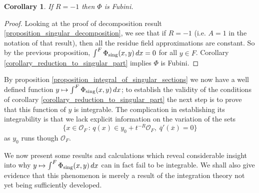 \documentclass{lmsMODIFIED}
\newtheorem{corollary}[theorem]{Corollary}
\newcommand{\roi}{\mathcal{O}}
\newcommand{\res}[1]{\overline{#1}}
\newcommand{\sub}[1]{{\mbox{\scriptsize {#1}}}}
\begin{document}
\begin{corollary}\label{corollary_R=-1}
If $R=-1$ then $\Phi$ is Fubini.
\end{corollary}
\begin{proof}
Looking at the proof of decomposition result \ref{proposition_singular_decomposition}, we see that if $R=-1$ (i.e. $A=1$ in the notation of that result), then all the residue field approximations are constant. So by the previous proposition, $\int^F\Phi_\sub{sing}(x,y)\,dx=0$ for all $y\in F$. Corollary \ref{corollary_reduction_to_singular_part} implies $\Phi$ is Fubini.
\end{proof}

By proposition \ref{proposition_integral_of_singular_sections} we now have a well defined function $y\mapsto\int^F\Phi_\sub{sing}(x,y)\,dx$; to establish the validity of the conditions of corollary \ref{corollary_reduction_to_singular_part} the next step is to prove that this function of $y$ is integrable. The complication in establishing its integrability is that we lack explicit information on the variation of the sets \[\{x\in\roi_{F}\,:\,q(x)\in y_0+t^{-R}\roi_{F},\;\res{q}'(\res{x})=0\}\] as $y_0$ runs though $\roi_{F}$.

We now present some results and calculations which reveal considerable insight into why $y\mapsto\int^F\Phi_\sub{sing}(x,y)\,dx$ can in fact fail to be integrable. We shall also give evidence that this phenomenon is merely a result of the integration theory not yet being sufficiently developed.
\end{document}
